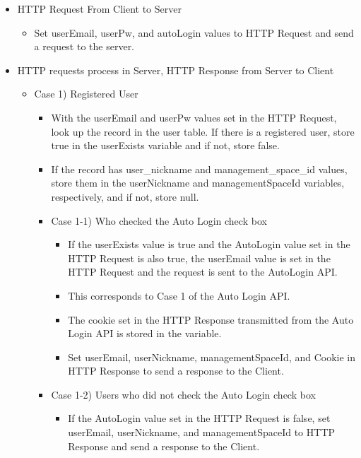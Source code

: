 \documentclass[conference]{IEEEtran}
\begin{document}
\begin{itemize}
    \item HTTP Request From Client to Server
    \begin{itemize}
        \item Set userEmail, userPw, and autoLogin values to HTTP Request and send a request to the server.
        \\
    \end{itemize}
    \item HTTP requests process in Server, HTTP Response from Server to Client
    \begin{itemize}
        \item Case 1) Registered User
        \begin{itemize}
            \item With the userEmail and userPw values set in the HTTP Request, look up the record in the user table. If there is a registered user, store true in the userExists variable and if not, store false.
            \item If the record has user\_nickname and management\_space\_id values, store them in the userNickname and managementSpaceId variables, respectively, and if not, store null.
            \item Case 1-1) Who checked the Auto Login check box
            \begin{itemize}
                \item If the userExists value is true and the AutoLogin value set in the HTTP Request is also true, the userEmail value is set in the HTTP Request and the request is sent to the AutoLogin API.
                \item This corresponds to Case 1 of the Auto Login API.
                \item The cookie set in the HTTP Response transmitted from the Auto Login API is stored in the variable.
                \item Set userEmail, userNickname, managementSpaceId, and Cookie in HTTP Response to send a response to the Client.
            \end{itemize}
            \item Case 1-2) Users who did not check the Auto Login check box
            \begin{itemize}
                \item If the AutoLogin value set in the HTTP Request is false, set userEmail, userNickname, and managementSpaceId to HTTP Response and send a response to the Client.
            \end{itemize}

\end{itemize}
\end{itemize}
\end{itemize}
\end{document}
